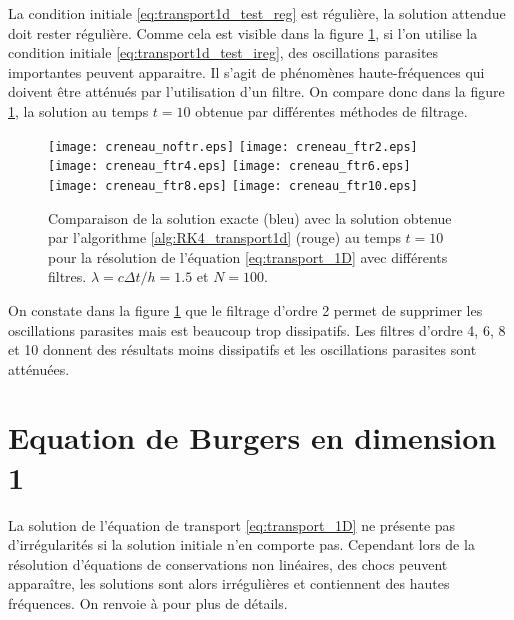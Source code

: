La condition initiale \eqref{eq:transport1d_test_reg} est régulière, la solution attendue doit rester régulière. Comme cela est visible dans la figure \ref{fig:comp_ireg}, si l'on utilise la condition initiale \eqref{eq:transport1d_test_ireg}, des oscillations parasites importantes peuvent apparaitre. Il s'agit de phénomènes haute-fréquences qui doivent être atténués par l'utilisation d'un filtre. On compare donc dans la figure \ref{fig:comp_ireg}, la solution au temps $t=10$ obtenue par différentes méthodes de filtrage.
\begin{figure}[htbp]
\begin{center}
\texttt{[image: creneau\_noftr.eps]}
\texttt{[image: creneau\_ftr2.eps]}\\
\texttt{[image: creneau\_ftr4.eps]}
\texttt{[image: creneau\_ftr6.eps]}\\
\texttt{[image: creneau\_ftr8.eps]}
\texttt{[image: creneau\_ftr10.eps]}\\
\end{center}
\caption{Comparaison de la solution exacte (bleu) avec la solution obtenue par l'algorithme \ref{alg:RK4_transport1d} (rouge) au temps $t=10$ pour la résolution de l'équation \eqref{eq:transport_1D} avec différents filtres. $\lambda = c \Delta t / h = 1.5$ et $N=100$.}
\label{fig:comp_ireg}
\end{figure}
On constate dans la figure \ref{fig:comp_ireg} que le filtrage d'ordre 2 permet de supprimer les oscillations parasites mais est beaucoup trop dissipatifs. Les filtres d'ordre 4, 6, 8 et 10 donnent des résultats moins dissipatifs et les oscillations parasites sont atténuées.

















\section{Equation de Burgers en dimension 1}

La solution de l'équation de transport \eqref{eq:transport_1D} ne présente pas d'irrégularités si la solution initiale n'en comporte pas. Cependant lors de la résolution d'équations de conservations non linéaires, des chocs peuvent apparaître, les solutions sont alors irrégulières et contiennent des hautes fréquences. On renvoie à \cite{Witham1974} pour plus de détails.

